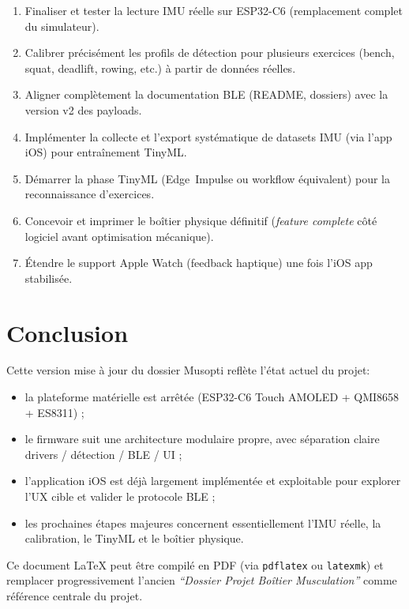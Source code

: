 \documentclass[a4paper,11pt]{article}
\begin{document}
\begin{enumerate}
  \item Finaliser et tester la lecture IMU réelle sur ESP32-C6 (remplacement complet du simulateur).
  \item Calibrer précisément les profils de détection pour plusieurs exercices (bench, squat, deadlift, rowing, etc.) à partir de données réelles.
  \item Aligner complètement la documentation BLE (README, dossiers) avec la version v2 des payloads.
  \item Implémenter la collecte et l'export systématique de datasets IMU (via l'app iOS) pour entraînement TinyML.
  \item Démarrer la phase TinyML (Edge~Impulse ou workflow équivalent) pour la reconnaissance d'exercices.
  \item Concevoir et imprimer le boîtier physique définitif (\emph{feature complete} côté logiciel avant optimisation mécanique).
  \item Étendre le support Apple Watch (feedback haptique) une fois l'iOS app stabilisée.
\end{enumerate}

\section{Conclusion}

Cette version mise à jour du dossier Musopti reflète l'état actuel du projet:
\begin{itemize}
  \item la plateforme matérielle est arrêtée (ESP32-C6 Touch AMOLED + QMI8658 + ES8311) ;
  \item le firmware suit une architecture modulaire propre, avec séparation claire drivers / détection / BLE / UI ;
  \item l'application iOS est déjà largement implémentée et exploitable pour explorer l'UX cible et valider le protocole BLE ;
  \item les prochaines étapes majeures concernent essentiellement l'IMU réelle, la calibration, le TinyML et le boîtier physique.
\end{itemize}

Ce document LaTeX peut être compilé en PDF (via \texttt{pdflatex} ou \texttt{latexmk}) et remplacer progressivement l'ancien \emph{``Dossier Projet Boîtier Musculation''} comme référence centrale du projet.
\end{document}
